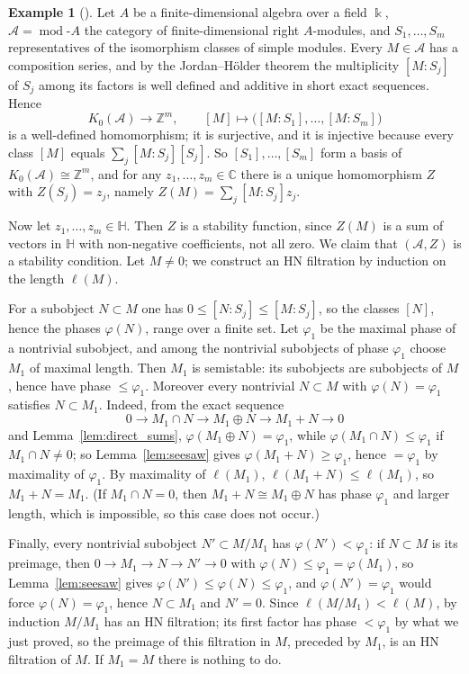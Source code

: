 \documentclass[12pt]{amsart}
\numberwithin{theorem}{section}
\theoremstyle{definition}
\newtheorem{example}[theorem]{Example}
\newcommand{\CC}{\mathbb{C}}
\newcommand{\ZZ}{\mathbb{Z}}
\newcommand{\HH}{\mathbb{H}}
\newcommand{\calA}{\mathcal{A}}
\newcommand{\kk}{\Bbbk}
\newcommand{\Kgroup}{K_0}
\begin{document}
	\begin{example}[{\cite[Exercise~4.13]{MS17}}]
		\label{ex:finite_dim_algebra}
		Let $A$ be a finite-dimensional algebra over a field $\kk$, $\calA = \operatorname{mod}\text{-}A$ the category of finite-dimensional right $A$-modules, and $S_1, \ldots, S_m$ representatives of the isomorphism classes of simple modules. Every $M \in \calA$ has a composition series, and by the Jordan--H\"older theorem the multiplicity $[M : S_j]$ of $S_j$ among its factors is well defined and additive in short exact sequences. Hence
		\[
		\Kgroup(\calA) \longrightarrow \ZZ^m, \qquad [M] \longmapsto \big( [M : S_1], \ldots, [M : S_m] \big)
		\]
		is a well-defined homomorphism; it is surjective, and it is injective because every class $[M]$ equals $\sum_j [M : S_j] [S_j]$. So $[S_1], \ldots, [S_m]$ form a basis of $\Kgroup(\calA) \cong \ZZ^m$, and for any $z_1, \ldots, z_m \in \CC$ there is a unique homomorphism $Z$ with $Z(S_j) = z_j$, namely $Z(M) = \sum_j [M : S_j] z_j$.
		
		Now let $z_1, \ldots, z_m \in \HH$. Then $Z$ is a stability function, since $Z(M)$ is a sum of vectors in $\HH$ with non-negative coefficients, not all zero. We claim that $(\calA, Z)$ is a stability condition. Let $M \neq 0$; we construct an HN filtration by induction on the length $\ell(M)$.
		
		For a subobject $N \subset M$ one has $0 \leqslant [N : S_j] \leqslant [M : S_j]$, so the classes $[N]$, hence the phases $\varphi(N)$, range over a finite set. Let $\varphi_1$ be the maximal phase of a nontrivial subobject, and among the nontrivial subobjects of phase $\varphi_1$ choose $M_1$ of maximal length. Then $M_1$ is semistable: its subobjects are subobjects of $M$, hence have phase $\leqslant \varphi_1$. Moreover every nontrivial $N \subset M$ with $\varphi(N) = \varphi_1$ satisfies $N \subset M_1$. Indeed, from the exact sequence
		\[
		0 \to M_1 \cap N \to M_1 \oplus N \to M_1 + N \to 0
		\]
		and Lemma~\ref{lem:direct_sums}, $\varphi(M_1 \oplus N) = \varphi_1$, while $\varphi(M_1 \cap N) \leqslant \varphi_1$ if $M_1 \cap N \neq 0$; so Lemma~\ref{lem:seesaw} gives $\varphi(M_1 + N) \geqslant \varphi_1$, hence $= \varphi_1$ by maximality of $\varphi_1$. By maximality of $\ell(M_1)$, $\ell(M_1 + N) \leqslant \ell(M_1)$, so $M_1 + N = M_1$. (If $M_1 \cap N = 0$, then $M_1 + N \cong M_1 \oplus N$ has phase $\varphi_1$ and larger length, which is impossible, so this case does not occur.)
		
		Finally, every nontrivial subobject $N' \subset M / M_1$ has $\varphi(N') < \varphi_1$: if $N \subset M$ is its preimage, then $0 \to M_1 \to N \to N' \to 0$ with $\varphi(N) \leqslant \varphi_1 = \varphi(M_1)$, so Lemma~\ref{lem:seesaw} gives $\varphi(N') \leqslant \varphi(N) \leqslant \varphi_1$, and $\varphi(N') = \varphi_1$ would force $\varphi(N) = \varphi_1$, hence $N \subset M_1$ and $N' = 0$. Since $\ell(M / M_1) < \ell(M)$, by induction $M / M_1$ has an HN filtration; its first factor has phase $< \varphi_1$ by what we just proved, so the preimage of this filtration in $M$, preceded by $M_1$, is an HN filtration of $M$. If $M_1 = M$ there is nothing to do.
	\end{example}
	
\end{document}
